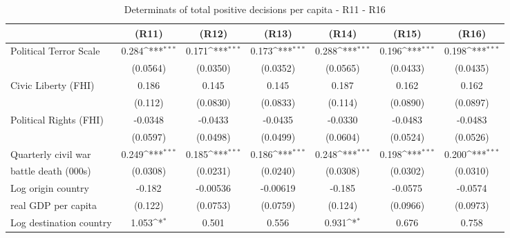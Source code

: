 \begin{table}[htbp]\centering \scriptsize
\def\sym#1{\ifmmode^{#1}\else\(^{#1}\)\fi}
\caption{Determinats of total positive decisions per capita - R11 - R16}
\begin{tabular}{l*{6}{c}}
\hline\hline
                    &\multicolumn{1}{c}{(R11)}&\multicolumn{1}{c}{(R12)}&\multicolumn{1}{c}{(R13)}&\multicolumn{1}{c}{(R14)}&\multicolumn{1}{c}{(R15)}&\multicolumn{1}{c}{(R16)}\\
\hline
Political Terror Scale&       0.284\sym{***}&       0.171\sym{***}&       0.173\sym{***}&       0.288\sym{***}&       0.196\sym{***}&       0.198\sym{***}\\
                    &    (0.0564)         &    (0.0350)         &    (0.0352)         &    (0.0565)         &    (0.0433)         &    (0.0435)         \\
[0,5em]
Civic Liberty (FHI) &       0.186         &       0.145         &       0.145         &       0.187         &       0.162         &       0.162         \\
                    &     (0.112)         &    (0.0830)         &    (0.0833)         &     (0.114)         &    (0.0890)         &    (0.0897)         \\
[0,5em]
Political Rights (FHI)&     -0.0348         &     -0.0433         &     -0.0435         &     -0.0330         &     -0.0483         &     -0.0483         \\
                    &    (0.0597)         &    (0.0498)         &    (0.0499)         &    (0.0604)         &    (0.0524)         &    (0.0526)         \\
[0,5em]
Quarterly civil war&       0.249\sym{***}&       0.185\sym{***}&       0.186\sym{***}&       0.248\sym{***}&       0.198\sym{***}&       0.200\sym{***}\\
 battle death (000s)                    &    (0.0308)         &    (0.0231)         &    (0.0240)         &    (0.0308)         &    (0.0302)         &    (0.0310)         \\
[0,5em]
Log origin country &      -0.182         &    -0.00536         &    -0.00619         &      -0.185         &     -0.0575         &     -0.0574         \\
real GDP per capita                    &     (0.122)         &    (0.0753)         &    (0.0759)         &     (0.124)         &    (0.0966)         &    (0.0973)         \\
[0,5em]
Log destination country &       1.053\sym{*}  &       0.501         &       0.556         &       0.931\sym{*}  &       0.676         &       0.758         \\

\end{tabular}
\end{table}
